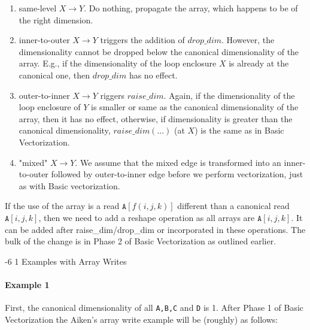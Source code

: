 \documentclass[sigconf, screen, natbib=false, dvipsnames, table]{acmart}
\makeatletter
\renewcommand{\subsubsection}{\@startsection{subsubsection}{3}{\z@}%
                        {-6\p@ \@plus -4\p@ \@minus -4\p@}%
                        {1\p@ \@plus 1\p@ \@minus 0\p@}%
                        {\normalfont\normalsize\bfseries\boldmath}}
\theoremstyle{definition}
\makeatother
\begin{document}
\begin{enumerate}

\item same-level $X \rightarrow Y$. Do nothing, propagate the array, which happens to be of the right dimension. 

\item inner-to-outer $X \rightarrow Y$ triggers the addition of $\mathit{drop\_dim}$. However, the dimensionality cannot be dropped below the canonical dimensionality of the array. E.g., if the dimensionality of the loop enclosure $X$ is already at the canonical one, then $\mathit{drop\_dim}$ has no effect.

\item outer-to-inner $X \rightarrow Y$ riggers  $\mathit{raise\_dim}$. Again, if the dimensionality of the loop enclosure of $Y$ is smaller or same as the canonical dimensionality of the array, then it has no effect, otherwise, if dimensionality is greater than the canonical dimensionality, $\mathit{raise\_dim(...)}$ (at $X$) is the same as in Basic Vectorization.

\item "mixed" $X \rightarrow Y$. We assume that the mixed edge is transformed into an inner-to-outer followed by outer-to-inner edge before we perform vectorization, just as with Basic vectorization.

\end{enumerate}

If the use of the array is a read $\texttt{A}[f(i,j,k)]$ different than a canonical read $\texttt{A}[i,j,k]$, then we need to add a reshape operation as 
all arrays are $\texttt{A}[i,j,k]$. It can be added after raise\_dim/drop\_dim or incorporated in these operations.
The bulk of the change is in Phase 2 of Basic Vectorization as outlined earlier.

\subsubsection{Examples with Array Writes}

\paragraph{Example 1}

First, the canonical dimensionality of all \texttt{A,B,C} and \texttt{D} is 1. 
After Phase 1 of Basic Vectorization the Aiken's array write example will be (roughly) as follows:
\end{document}

